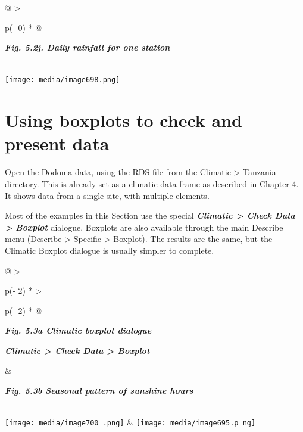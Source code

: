 \documentclass[
  letterpaper,
  DIV=11,
  numbers=noendperiod]{scrreprt}
\begin{document}
\begin{longtable}[]{@{}
  >{\raggedright\arraybackslash}p{(\columnwidth - 0\tabcolsep) * }@{}}
\toprule\noalign{}
\begin{minipage}[b]{\linewidth}\raggedright
\textbf{\emph{Fig. 5.2j. Daily rainfall for one station}}
\end{minipage} \\
\midrule\noalign{}
\endhead
\bottomrule\noalign{}
\endlastfoot
\texttt{[image: media/image698.png]} \\
\end{longtable}

\section{Using boxplots to check and present
data}\label{using-boxplots-to-check-and-present-data}

Open the Dodoma data, using the RDS file from the Climatic
\textgreater{} Tanzania directory. This is already set as a climatic
data frame as described in Chapter 4. It shows data from a single site,
with multiple elements.

Most of the examples in this Section use the special
\textbf{\emph{Climatic \textgreater{} Check Data \textgreater{}
Boxplot}} dialogue. Boxplots are also available through the main
Describe menu (Describe \textgreater{} Specific \textgreater{} Boxplot).
The results are the same, but the Climatic Boxplot dialogue is usually
simpler to complete.

\begin{longtable}[]{@{}
  >{\raggedright\arraybackslash}p{(\columnwidth - 2\tabcolsep) * }
  >{\raggedright\arraybackslash}p{(\columnwidth - 2\tabcolsep) * }@{}}
\toprule\noalign{}
\begin{minipage}[b]{\linewidth}\raggedright
\textbf{\emph{Fig. 5.3a Climatic boxplot dialogue}}

\textbf{\emph{Climatic \textgreater{} Check Data \textgreater{}
Boxplot}}
\end{minipage} & \begin{minipage}[b]{\linewidth}\raggedright
\textbf{\emph{Fig. 5.3b Seasonal pattern of sunshine hours}}
\end{minipage} \\
\midrule\noalign{}
\endhead
\bottomrule\noalign{}
\endlastfoot
\texttt{[image: media/image700 .png]}
&
\texttt{[image: media/image695.p ng]} \\
\end{longtable}
\end{document}
